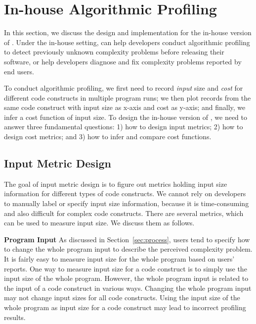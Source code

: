 
\newpage
\section{In-house Algorithmic Profiling}
\label{sec:inhouse}

In this section, we discuss the design and implementation for the in-house version of \Tool.
Under the in-house setting, 
\Tool can help developers conduct algorithmic profiling to detect 
previously unknown complexity problems before releasing their software, 
or help developers diagnose and fix complexity problems reported by end users. 

To conduct algorithmic profiling,
we first need to record \textit{input} size and \textit{cost} for different code constructs 
in multiple program runs;
we then plot records from the same code construct with input size as x-axis and cost as y-axis; 
and finally, we infer a cost function of input size.
To design the in-house version of \Tool, 
we need to answer three fundamental questions:
1) how to design input metrics; 
2) how to design cost metrics;
and 3) how to infer and compare cost functions. 

\subsection{Input Metric Design}
\label{sec:input}

The goal of input metric design is to figure out metrics
holding input size information for different types of code constructs. 
We cannot rely on developers to manually label or specify input size information, 
because it is time-consuming and also difficult for complex code constructs.  
There are several metrics, which can be used to measure input size.
We discuss them as follows. 

\noindent\textbf{Program Input}
As discussed in Section~\ref{sec:process}, 
users tend to specify how to change the whole program 
input to describe the perceived complexity problem.
It is fairly easy to measure input size for the whole program based on users' reports.
One way to measure input size for a code construct
is to simply use the input size of the whole program. 
However, the whole program input 
is related to the input of a code construct in various ways.
Changing the whole program input may not change input sizes for 
all code constructs. 
Using the input size of the whole program as input size for a code 
construct may lead to incorrect profiling results. 

